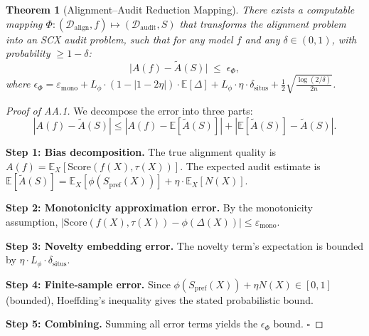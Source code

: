 \documentclass[12pt,a4paper]{article}
\newtheorem{theorem}{Theorem}[section]
\newcommand{\E}{\mathbb{E}}
\newcommand{\cD}{\mathcal{D}}
\begin{document}
\begin{theorem}[Alignment--Audit Reduction Mapping]
\label{thm:reduction}
There exists a computable mapping $\Phi: (\cD_{\mathrm{align}}, f) \longmapsto (\cD_{\mathrm{audit}}, S)$ that transforms the alignment problem into an \textsf{SCX} audit problem, such that for any model $f$ and any $\delta\in(0,1)$, with probability $\geq 1-\delta$:
\[
\bigl| A(f) - \tilde{A}(S) \bigr| \;\leq\; \epsilon_\Phi,
\]
where $\epsilon_\Phi = \varepsilon_{\mathrm{mono}} + L_\phi \cdot (1-|1-2\eta|) \cdot \E[\Delta] + L_\phi \cdot \eta \cdot \delta_{\mathrm{situs}} + \frac{1}{2}\sqrt{\frac{\log(2/\delta)}{2n}}$.
\end{theorem}

\begin{proof}[Proof of AA.1]
We decompose the error into three parts:
\[
|A(f) - \tilde{A}(S)| \leq |A(f) - \E[\tilde{A}(S)]| + |\E[\tilde{A}(S)] - \tilde{A}(S)|.
\]

\textbf{Step 1: Bias decomposition.} The true alignment quality is $A(f) = \E_X[\mathrm{Score}(f(X), \tau(X))]$. The expected audit estimate is $\E[\tilde{A}(S)] = \E_X[\phi(S_{\mathrm{pref}}(X))] + \eta\cdot\E_X[N(X)]$.

\textbf{Step 2: Monotonicity approximation error.} By the monotonicity assumption, $|\mathrm{Score}(f(X),\tau(X)) - \phi(\Delta(X))| \leq \varepsilon_{\mathrm{mono}}$.

\textbf{Step 3: Novelty embedding error.} The novelty term's expectation is bounded by $\eta\cdot L_\phi \cdot \delta_{\mathrm{situs}}$.

\textbf{Step 4: Finite-sample error.} Since $\phi(S_{\mathrm{pref}}(X)) + \eta N(X) \in [0, 1]$ (bounded), Hoeffding's inequality gives the stated probabilistic bound.

\textbf{Step 5: Combining.} Summing all error terms yields the $\epsilon_\Phi$ bound. $\square$
\end{proof}
\end{document}
